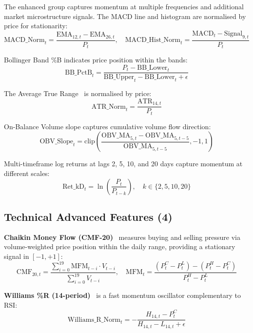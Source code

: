 \documentclass[10pt,a4paper,twoside]{article}
\begin{document}
The enhanced group captures momentum at multiple frequencies and additional
market microstructure signals. The MACD line and histogram are normalised by
price for stationarity:
\begin{equation}
  \text{MACD\_Norm}_t = \frac{\text{EMA}_{12,t} - \text{EMA}_{26,t}}{P_t}, \quad
  \text{MACD\_Hist\_Norm}_t = \frac{\text{MACD}_t - \text{Signal}_{9,t}}{P_t}
\end{equation}

Bollinger Band \%B indicates price position within the bands:
\begin{equation}
  \text{BB\_PctB}_t = \frac{P_t - \text{BB\_Lower}_t}{\text{BB\_Upper}_t - \text{BB\_Lower}_t + \epsilon}
\end{equation}

The Average True Range~\cite{wilder1978} is normalised by price:
\begin{equation}
  \text{ATR\_Norm}_t = \frac{\text{ATR}_{14,t}}{P_t}
\end{equation}

On-Balance Volume slope captures cumulative volume flow direction:
\begin{equation}
  \text{OBV\_Slope}_t = \text{clip}\!\left(\frac{\text{OBV\_MA}_{5,t} - \text{OBV\_MA}_{5,t-5}}{\text{OBV\_MA}_{5,t-5}}, -1, 1\right)
\end{equation}

Multi-timeframe log returns at lags 2, 5, 10, and 20 days capture momentum at
different scales:
\begin{equation}
  \text{Ret\_kD}_t = \ln\!\left(\frac{P_t}{P_{t-k}}\right), \quad k \in \{2, 5, 10, 20\}
\end{equation}

\subsection{Technical Advanced Features (4)}

\textbf{Chaikin Money Flow (CMF-20)}~\cite{chaikin1978} measures buying and
selling pressure via volume-weighted price position within the daily range,
providing a stationary signal in $[-1, +1]$:
\begin{equation}
  \text{CMF}_{20,t} = \frac{\sum_{i=0}^{19} \text{MFM}_{t-i} \cdot V_{t-i}}
                          {\sum_{i=0}^{19} V_{t-i}}, \quad
  \text{MFM}_t = \frac{(P_t^C - P_t^L) - (P_t^H - P_t^C)}{P_t^H - P_t^L}
\end{equation}

\textbf{Williams \%R (14-period)}~\cite{williams1979} is a fast momentum
oscillator complementary to RSI:
\begin{equation}
  \text{Williams\_R\_Norm}_t = -\frac{H_{14,t} - P_t^C}{H_{14,t} - L_{14,t} + \epsilon}
\end{equation}
\end{document}
